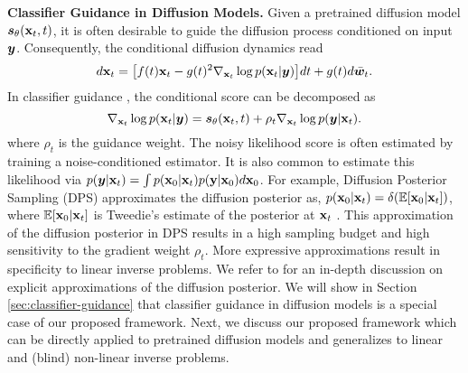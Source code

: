 \textbf{Classifier Guidance in Diffusion Models.} Given a pretrained diffusion model ${\bm{s}}_{\theta}({\mathbf{x}}_t, t)$, it is often desirable to guide the diffusion process conditioned on input ${\bm{y}}$. Consequently, the conditional diffusion dynamics read
\begin{equation}
    d {\mathbf{x}}_t = \big[f(t){\mathbf{x}}_t - g(t)^2 \nabla_{{\mathbf{x}}_t} \log p({\mathbf{x}}_t|{\bm{y}})\big] dt + g(t)d\bar{{\bm{w}}}_t.
\end{equation}
In classifier guidance \citep{dhariwal2021diffusion}, the conditional score can be decomposed as 
\begin{equation}
    \nabla_{{\mathbf{x}}_t} \log p({\mathbf{x}}_t|{\bm{y}}) = {\bm{s}}_{\theta}({\mathbf{x}}_t, t) + \rho_t \nabla_{{\mathbf{x}}_t} \log p({\bm{y}}|{\mathbf{x}}_t).
    \label{eq:class_guidance}
\end{equation}
where $\rho_t$ is the guidance weight. The noisy likelihood score is often estimated by training a noise-conditioned estimator. It is also common to estimate this likelihood via $p({\bm{y}}|{\mathbf{x}}_t)=\int p({\mathbf{x}}_0|{\mathbf{x}}_t)p({\mathbf{y}}|{\mathbf{x}}_0) d{\mathbf{x}}_0$. For example, Diffusion Posterior Sampling (DPS) \citep{chung2022diffusion} approximates the diffusion posterior as, $p({\mathbf{x}}_0|{\mathbf{x}}_t) = \delta(\mathbb{E}[{\mathbf{x}}_0|{\mathbf{x}}_t])$, where $\mathbb{E}[{\mathbf{x}}_0|{\mathbf{x}}_t]$ is Tweedie's estimate of the posterior at ${\mathbf{x}}_t$ \citep{tweedie}. This approximation of the diffusion posterior in DPS results in a high sampling budget and high sensitivity to the gradient weight $\rho_t$. More expressive approximations \citep{song2022pseudoinverse, pandey2024fast} result in specificity to linear inverse problems. We refer to \citet{daras2024surveydiffusionmodelsinverse} for an in-depth discussion on explicit approximations of the diffusion posterior. We will show in Section \ref{sec:classifier-guidance} that classifier guidance in diffusion models is a special case of our proposed framework. Next, we discuss our proposed framework which can be directly applied to pretrained diffusion models and generalizes to linear and (blind) non-linear inverse problems.
